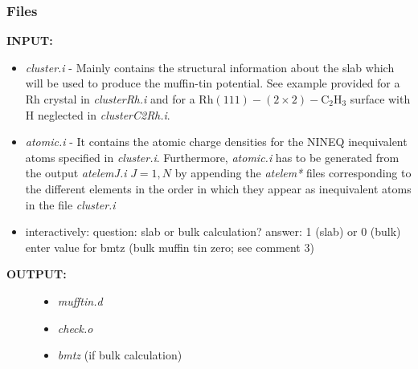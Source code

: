\documentclass[letterpaper,10pt,english]{sphinxmanual}
\begin{document}
\subsubsection{Files}
\label{phshift2007:id2}
\textbf{INPUT:}
\begin{itemize}
\item {} 
\emph{cluster.i} - Mainly contains the structural information
about the slab which will be used to produce
the muffin-tin potential. See example
provided for a Rh crystal in \emph{clusterRh.i}
and for a $\text{Rh} (111)-(2 \times 2)- \text{C} _2 \text{H} _3$
surface with H neglected in \emph{clusterC2Rh.i}.

\item {} 
\emph{atomic.i}  - It contains the atomic charge densities for
the NINEQ inequivalent atoms specified in
\emph{cluster.i}. Furthermore,
\emph{atomic.i} has to be generated from the output
\emph{atelemJ.i}  $J = 1, N$ by appending the \emph{atelem*}
files corresponding to the different elements
in the order in which they appear as
inequivalent atoms in the file \emph{cluster.i}

\item {} 
interactively:  question: slab or bulk calculation?
answer: 1 (slab) or 0 (bulk)
enter value for bmtz (bulk muffin tin
zero; see comment 3)

\end{itemize}
\begin{description}
\item[{\textbf{OUTPUT:}}] \leavevmode\begin{itemize}
\item {} 
\emph{mufftin.d}

\item {} 
\emph{check.o}

\item {} 
\emph{bmtz} (if bulk calculation)

\end{itemize}

\end{description}
\end{document}
